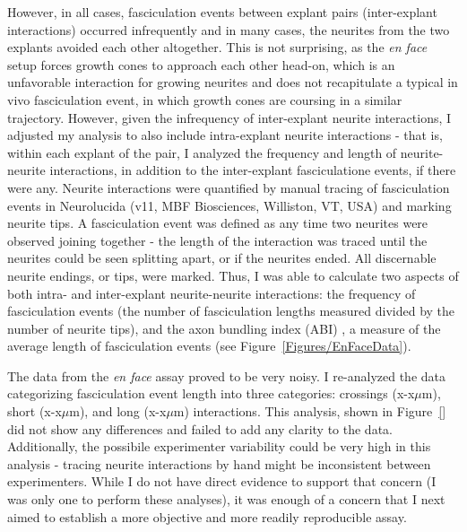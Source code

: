 However, in all cases, fasciculation events between explant pairs (inter-explant interactions) occurred infrequently and in many cases, the neurites from the two explants avoided each other altogether.
This is not surprising, as the \emph{en face} setup forces growth cones to approach each other head-on, which is an unfavorable interaction for growing neurites and does not recapitulate a typical in vivo fasciculation event, in which growth cones are coursing in a similar trajectory.
However, given the infrequency of inter-explant neurite interactions, I adjusted my analysis to also include intra-explant neurite interactions - that is, within each explant of the pair, I analyzed the frequency and length of neurite-neurite interactions, in addition to the inter-explant fasciculatione events, if there were any.
Neurite interactions were quantified by manual tracing of fasciculation events in Neurolucida (v11, MBF Biosciences, Williston, VT, USA) and marking neurite tips.
A fasciculation event was defined as any time two neurites were observed joining together - the length of the interaction was traced until the neurites could be seen splitting apart, or if the neurites ended.
All discernable neurite endings, or tips, were marked.
Thus, I was able to calculate two aspects of both intra- and inter-explant neurite-neurite interactions: the frequency of fasciculation events (the number of fasciculation lengths measured divided by the number of neurite tips), and the axon bundling index (ABI) \cite[after][]{barry2010polarized}, a measure of the average length of fasciculation events (see Figure~\ref{Figures/EnFaceData}).


The data from the \emph{en face} assay proved to be very noisy.
I re-analyzed the data categorizing fasciculation event length into three categories: crossings (x-x$\mu$m), short (x-x$\mu$m), and long (x-x$\mu$m) interactions.
This analysis, shown in Figure~\ref{} did not show any differences and failed to add any clarity to the data.
Additionally, the possibile experimenter variability could be very high in this analysis - tracing neurite interactions by hand might be inconsistent between experimenters.
While I do not have direct evidence to support that concern (I was only one to perform these analyses), it was enough of a concern that I next aimed to establish a more objective and more readily reproducible assay.